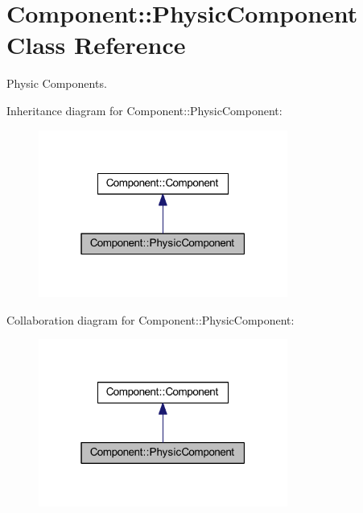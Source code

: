 \hypertarget{class_component_1_1_physic_component}{}\section{Component\+:\+:Physic\+Component Class Reference}
\label{class_component_1_1_physic_component}


Physic Components.  




Inheritance diagram for Component\+:\+:Physic\+Component\+:
\nopagebreak
\begin{figure}[H]
\begin{center}
\leavevmode
\includegraphics[width=232pt]{class_component_1_1_physic_component__inherit__graph}
\end{center}
\end{figure}


Collaboration diagram for Component\+:\+:Physic\+Component\+:
\nopagebreak
\begin{figure}[H]
\begin{center}
\leavevmode
\includegraphics[width=232pt]{class_component_1_1_physic_component__coll__graph}
\end{center}
\end{figure}
